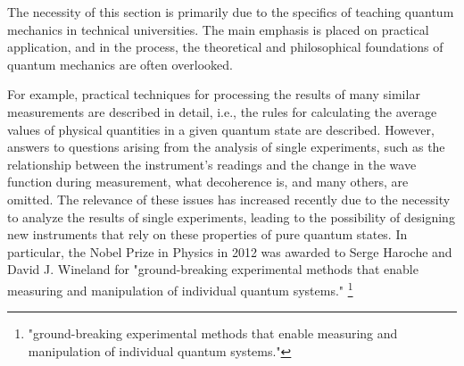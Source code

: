 The necessity of this section is primarily due to the specifics of teaching quantum mechanics in technical universities. The main emphasis is placed on practical application, and in the process, the theoretical and philosophical foundations of quantum mechanics are often overlooked.

For example, practical techniques for processing the results of many similar measurements are described in detail, i.e., the rules for calculating the average values of physical quantities in a given quantum state are described. However, answers to questions arising from the analysis of single experiments, such as the relationship between the instrument's readings and the change in the wave function during measurement, what decoherence  is, and many others, are omitted. The relevance of these issues has increased recently due to the necessity to analyze the results of single experiments, leading to the possibility of designing new instruments that rely on these properties of pure quantum states. In particular, the Nobel Prize in Physics in 2012 was awarded to Serge Haroche and David J. Wineland for "ground-breaking experimental methods that enable measuring and manipulation of individual quantum systems."
\footnote{
"ground-breaking experimental methods that enable measuring and manipulation of individual quantum systems."
}